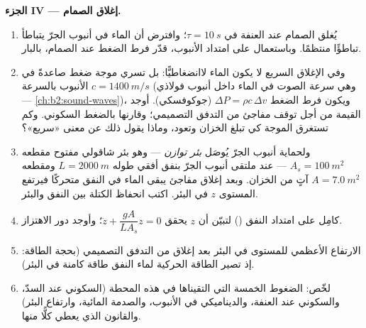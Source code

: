 \begin{problem}
\medskip
\noindent\textbf{الجزء IV --- إغلاق الصمام.}
\begin{enumerate}[resume]
  \item يُغلق الصمام عند العنفة في $\tau = \qty{10}{s}$؛ وافترض أن
        الماء في أنبوب الجرّ يتباطأ تباطؤًا منتظمًا. وباستعمال
         على امتداد الأنبوب، قدّر فرط الضغط عند
        الصمام، بالبار.
  \item وفي الإغلاق السريع لا يكون الماء لاانضغاطيًّا: بل تسري
        موجة ضغط صاعدةً في الأنبوب بالسرعة $c = \qty{1400}{m/s}$ (وهي
        سرعة الصوت في الماء داخل أنبوب فولاذي --- \cref{ch:b2:sound-waves})،
        ويكون فرط الضغط $\Delta P = \rho c\,\Delta v$ (جوكوفسكي).
        أوجد القيمة من أجل توقف مفاجئ من التدفق التصميمي؛
        وقارنها بالضغط السكوني. وكم تستغرق الموجة كي تبلغ
        الخزان وتعود، وماذا يقول ذلك عن معنى «سريع»؟
  \item ولحماية أنبوب الجرّ يُوصَل \emph{بئر توازن} --- وهو بئر
        شاقولي مفتوح مقطعه $A_s = \qty{100}{m^2}$ --- عند ملتقى
        أنبوب الجرّ بنفق أفقي طوله $L = \qty{2000}{m}$ ومقطعه $A =
        \qty{7.0}{m^2}$ آتٍ من الخزان. وبعد إغلاق مفاجئ يبقى
        الماء في النفق متحركًا فيرتفع المستوى $z$ في البئر. اكتب
        انحفاظ الكتلة بين النفق والبئر.
  \item كامِل  على امتداد النفق () لتبيّن أن
        $z$ يحقق $\ddot z + \dfrac{gA}{LA_s}z = 0$؛ وأوجد دور
        الاهتزاز.
  \item الارتفاع الأعظمي للمستوى في البئر بعد إغلاق من التدفق
        التصميمي (بحجة الطاقة: إذ تصير الطاقة الحركية لماء
        النفق طاقة كامنة في البئر).
  \item لخّص: الضغوط الخمسة التي التقيناها في هذه المحطة
        (السكوني عند السدّ، والسكوني عند العنفة، والديناميكي في
        الأنبوب، والصدمة المائية، وارتفاع البئر) والقانون الذي
        يعطي كلًّا منها.
\end{enumerate}
\end{problem}

